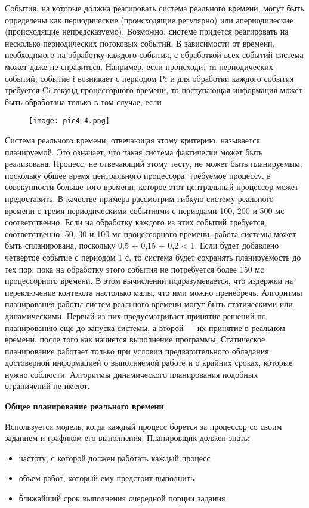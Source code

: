 События, на которые должна реагировать система реального времени, могут быть определены как периодические (происходящие регулярно) или апериодические (происходящие непредсказуемо). Возможно, системе придется реагировать на несколько периодических потоковых событий. В зависимости от времени, необходимого на обработку каждого события, с обработкой всех событий система может даже не справиться. Например, если происходит m периодических событий, событие i возникает с периодом Pi и для обработки каждого события требуется Ci секунд процессорного времени, то поступающая  информация может быть обработана только в том случае, если

\begin{figure}[!h]\center
   \texttt{[image: pic4-4.png]}
\end{figure}

Система реального времени, отвечающая этому критерию, называется планируемой. Это означает, что такая система фактически может быть реализована. Процесс, не отвечающий этому тесту, не может быть планируемым, поскольку общее время центрального процессора, требуемое процессу, в совокупности больше того времени, которое этот центральный процессор может предоставить. В качестве примера рассмотрим гибкую систему реального времени с тремя периодическими событиями с периодами 100, 200 и 500 мс соответственно. Если на обработку каждого из этих событий требуется, соответственно, 50, 30 и 100 мс процессорного времени, работа системы может быть спланирована, поскольку 0,5 + 0,15 + 0,2 < 1.
Если будет добавлено четвертое событие с периодом 1 с, то система будет сохранять
планируемость до тех пор, пока на обработку этого события не потребуется более
150 мс процессорного времени. В этом вычислении подразумевается, что издержки на
переключение контекста настолько малы, что ими можно пренебречь.
Алгоритмы планирования работы систем реального времени могут быть статическими или динамическими. Первый из них предусматривает принятие решений по
планированию еще до запуска системы, а второй — их принятие в реальном времени,
после того как начнется выполнение программы. Статическое планирование работает только при условии предварительного обладания достоверной информацией
о выполняемой работе и о крайних сроках, которые нужно соблюсти. Алгоритмы
динамического планирования подобных ограничений не имеют.

\textbf{Общее планирование реального времени}

Используется модель, когда каждый процесс борется за процессор со своим заданием и графиком его выполнения.
Планировщик должен знать:
\begin{itemize}
   \item частоту, с которой должен работать каждый процесс
   \item объем работ, который ему предстоит выполнить
   \item ближайший срок выполнения очередной порции задания
\end{itemize}

